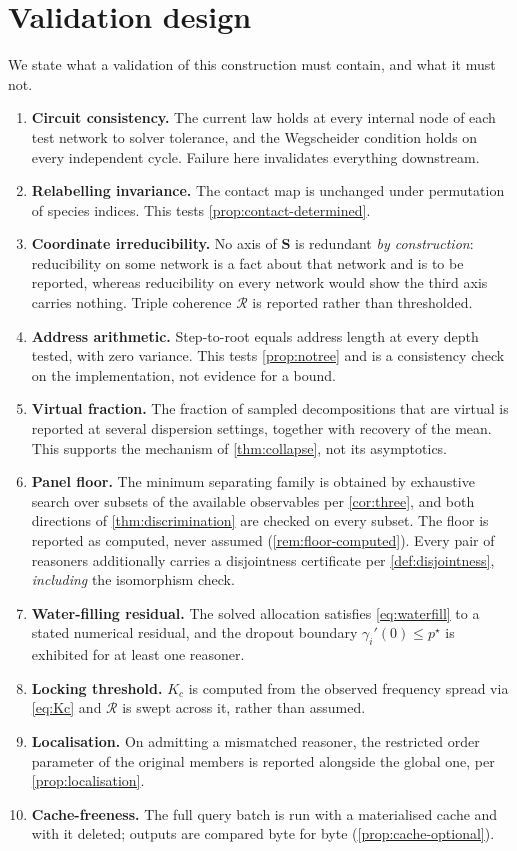 \documentclass[11pt,twocolumn,a4paper]{article}
\theoremstyle{plain}
\theoremstyle{definition}
\theoremstyle{remark}
\newcommand{\Scoord}{\mathbf{S}}
\begin{document}
\section{Validation design}
\label{sec:validation}

We state what a validation of this construction must contain, and what it must
not.

\begin{enumerate}[label=(V\arabic*),leftmargin=3em]
\item \textbf{Circuit consistency.} The current law holds at every internal node
of each test network to solver tolerance, and the Wegscheider condition holds on
every independent cycle. Failure here invalidates everything downstream.
\item \textbf{Relabelling invariance.} The contact map is unchanged under
permutation of species indices. This tests \cref{prop:contact-determined}.
\item \textbf{Coordinate irreducibility.} No axis of $\Scoord$ is redundant
\emph{by construction}: reducibility on some network is a fact about that
network and is to be reported, whereas reducibility on every network would show
the third axis carries nothing. Triple coherence $\mathcal{R}$ is reported
rather than thresholded.
\item \textbf{Address arithmetic.} Step-to-root equals address length at every
depth tested, with zero variance. This tests \cref{prop:notree} and is a
consistency check on the implementation, not evidence for a bound.
\item \textbf{Virtual fraction.} The fraction of sampled decompositions that are
virtual is reported at several dispersion settings, together with recovery of
the mean. This supports the mechanism of \cref{thm:collapse}, not its
asymptotics.
\item \textbf{Panel floor.} The minimum separating family is obtained by
exhaustive search over subsets of the available observables per
\cref{cor:three}, and both directions of \cref{thm:discrimination} are checked
on every subset. The floor is reported as computed, never assumed
(\cref{rem:floor-computed}). Every pair of reasoners additionally carries a
disjointness certificate per \cref{def:disjointness}, \emph{including} the
isomorphism check.
\item \textbf{Water-filling residual.} The solved allocation satisfies
\cref{eq:waterfill} to a stated numerical residual, and the dropout boundary
$\gamma_i'(0)\le p^\star$ is exhibited for at least one reasoner.
\item \textbf{Locking threshold.} $K_c$ is computed from the observed frequency
spread via \cref{eq:Kc} and $\mathcal{R}$ is swept across it, rather than
assumed.
\item \textbf{Localisation.} On admitting a mismatched reasoner, the restricted
order parameter of the original members is reported alongside the global one,
per \cref{prop:localisation}.
\item \textbf{Cache-freeness.} The full query batch is run with a materialised
cache and with it deleted; outputs are compared byte for byte
(\cref{prop:cache-optional}).
\end{enumerate}
\end{document}
